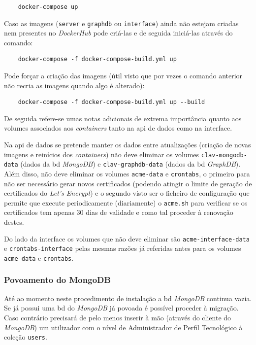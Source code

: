 \begin{verbatim}
    docker-compose up
\end{verbatim}

Caso as imagens (\texttt{server} e \texttt{graphdb} ou \texttt{interface}) ainda não estejam criadas nem presentes no \textit{DockerHub} pode criá-las e de seguida iniciá-las através do comando:

\begin{verbatim}
    docker-compose -f docker-compose-build.yml up
\end{verbatim}

Pode forçar a criação das imagens (útil visto que por vezes o comando anterior não recria as imagens quando algo é alterado):

\begin{verbatim}
    docker-compose -f docker-compose-build.yml up --build
\end{verbatim}

De seguida refere-se umas notas adicionais de extrema importância quanto aos volumes associados aos \textit{containers} tanto na \acrshort{api} de dados como na interface.

Na \acrshort{api} de dados se pretende manter os dados entre atualizações (criação de novas imagens e reinícios dos \textit{containers}) não deve eliminar os volumes \texttt{clav-mongodb-data} (dados da \acrshort{bd} \textit{MongoDB}) e \texttt{clav-graphdb-data} (dados da \acrshort{bd} \textit{GraphDB}). Além disso, não deve eliminar os volumes \texttt{acme-data} e \texttt{crontabs}, o primeiro para não ser necessário gerar novos certificados (podendo atingir o limite de geração de certificados do \textit{Let's Encrypt}) e o segundo visto ser o ficheiro de configuração que permite que execute periodicamente (diariamente) o \texttt{acme.sh} para verificar se os certificados tem apenas 30 dias de validade e como tal proceder à renovação destes.

Do lado da interface os volumes que não deve eliminar são \texttt{acme-interface-data} e \texttt{crontabs-interface} pelas mesmas razões já referidas antes para os volumes \texttt{acme-data} e \texttt{crontabs}. 

\subsubsection{Povoamento do MongoDB}
Até ao momento neste procedimento de instalação a \acrshort{bd} \textit{MongoDB} continua vazia. Se já possui uma \acrshort{bd} do \textit{MongoDB} já povoada é possível proceder à migração. Caso contrário precisará de pelo menos inserir à mão (através do cliente do \textit{MongoDB}) um utilizador com o nível de Administrador de Perfil Tecnológico à coleção \texttt{users}.

